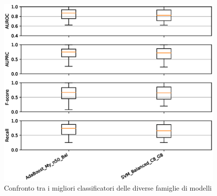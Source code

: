 \documentclass[12pt,a4paper,oneside,hidelinks]{report}
\begin{document}
\vspace*{\fill}



\vspace*{\fill}

\begin{figure}[ht]%
    \centering
    \includegraphics[scale = 0.80]{CC-level3.eps}%
    \caption{Confronto tra i migliori classificatori delle diverse famiglie di modelli}%
    \label{fig:liv3} 
\end{figure}

\vspace*{\fill}


\vspace*{\fill}
\end{document}
